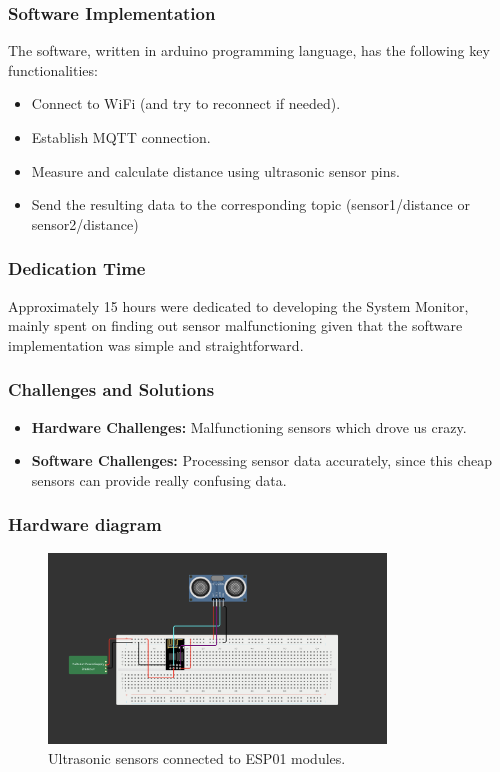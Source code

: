 \subsubsection{Software Implementation}
The software, written in arduino programming language, has the following key functionalities:
\begin{itemize}
    \item Connect to WiFi (and try to reconnect if needed).
    \item Establish MQTT connection.
    \item Measure and calculate distance using ultrasonic sensor pins.
    \item Send the resulting data to the corresponding topic (sensor1/distance or sensor2/distance)
\end{itemize}

\subsubsection{Dedication Time}
Approximately 15 hours were dedicated to developing the System Monitor, mainly spent on finding out sensor malfunctioning given that the software implementation was simple and straightforward.

\subsubsection{Challenges and Solutions}
\begin{itemize}
    \item \textbf{Hardware Challenges:} Malfunctioning sensors which drove us crazy.
    \item \textbf{Software Challenges:} Processing sensor data accurately, since this cheap sensors can provide really confusing data.
\end{itemize}

\subsubsection{Hardware diagram}
\begin{figure}[ht]
    \centering
    \includegraphics[width=0.8\textwidth]{../images/presence-sensor.png}
    \caption{Ultrasonic sensors connected to ESP01 modules.}
    \label{fig:esp32_system_monitor}
\end{figure}

